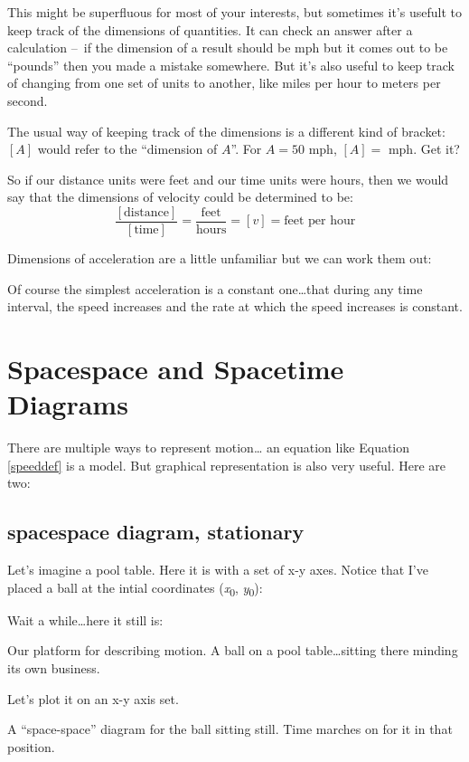\documentclass[
  letterpaper,
  DIV=11,
  numbers=noendperiod,
  oneside]{scrreprt}
\begin{document}
This might be superfluous for most of your interests, but sometimes it's
usefult to keep track of the dimensions of quantities. It can check an
answer after a calculation --~if the dimension of a result should be mph
but it comes out to be ``pounds'' then you made a mistake somewhere. But
it's also useful to keep track of changing from one set of units to
another, like miles per hour to meters per second.

The usual way of keeping track of the dimensions is a different kind of
bracket: \([A]\) would refer to the ``dimension of \(A\)''. For \(A=50\)
mph, \([A]=\) mph. Get it?

So if our distance units were feet and our time units were hours, then
we would say that the dimensions of velocity could be determined to be:
\[
\dfrac{[\text{distance}]}{[\text{time}]}=\dfrac{\text{feet}}{\text{hours}} = [v] = \text{feet per hour}
\]

Dimensions of acceleration are a little unfamiliar but we can work them
out:

Of course the simplest acceleration is a constant one\ldots that during
any time interval, the speed increases and the rate at which the speed
increases is constant.

\section{Spacespace and Spacetime Diagrams}\label{sec-spacetimediagrams}

There are multiple ways to represent motion\ldots{} an equation like
Equation \ref{speeddef} is a model. But graphical representation is also
very useful. Here are two:

\subsection{spacespace diagram,
stationary}\label{spacespace-diagram-stationary}

Let's imagine a pool table. Here it is with a set of x-y axes. Notice
that I've placed a ball at the intial coordinates
(\emph{x}\textsubscript{0}, \emph{y}\textsubscript{0}):

Wait a while\ldots here it still is:

Our platform for describing motion. A ball on a pool table\ldots sitting
there minding its own business.

Let's plot it on an x-y axis set.

A ``space-space'' diagram for the ball sitting still. Time marches on
for it in that position.
\end{document}
